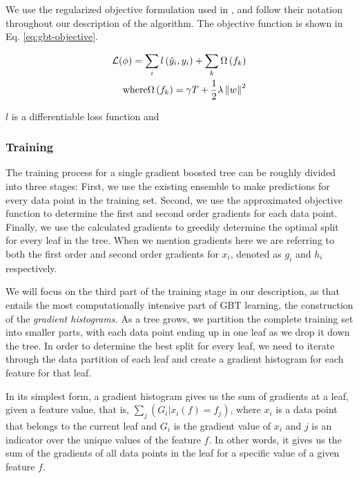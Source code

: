 
We use the
regularized objective formulation used
in \cite{xgboost}, and follow their notation throughout our description of the algorithm.
The objective function is shown in Eq. \ref{eq:gbt-objective}.

\begin{equation}
	\begin{split}
	\mathcal{L}(\phi) = \sum_{i} l\left(\hat{y}_{i},y_{i}\right) + \sum_{k} \Omega\left(f_{k}\right) \\
	\text{where} \Omega\left(f_{k}\right) = \gamma T + \frac{1}{2} \lambda \left\lVert w\right\rVert^2
	\end{split}
	\label{eq:gbt-objective}
\end{equation}

$l$ is a differentiable loss function and


\subsubsection*{Training}

The training process for a single gradient boosted tree can be roughly divided into three stages:
First, we use the existing ensemble to make predictions for every data point in the training
set. Second, we use the approximated objective function to determine the first and second order
gradients for each data point. Finally, we use the calculated gradients to greedily determine
the optimal split for every leaf in the tree. When we mention gradients here we are referring
to both the first order and second order gradients for $x_i$, denoted as $g_i$ and $h_i$
respectively.

We will focus on the third part of the training stage in our description, as that entails the most
computationally intensive part of GBT learning, the construction of the \emph{gradient histograms.}
As a tree grows, we partition the complete training set into smaller parts, with each data
point ending up in one leaf as we drop it down the tree.
In order to determine the best split for every leaf, we need to iterate through the data
partition of each leaf and create a gradient histogram for each feature for that leaf.

In its simplest form, a gradient histogram gives us the sum of gradients at a leaf,
given a feature value, that is, $\sum_{j}(G_i | x_i(f) = f_j)$, where $x_i$ is a data point
that belongs to the current leaf and  $G_i$ is the gradient value of $x_i$ and $j$ is an
indicator over the unique values of the feature $f$. In other words, it gives us the
sum of the gradients of all data points in the leaf for a specific value of a given
feature $f$.


